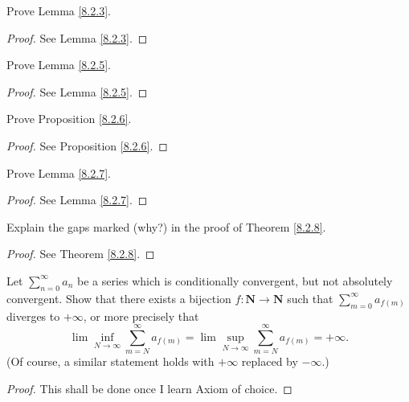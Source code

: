 \exercisesection

\begin{exercise}\label{ex 8.2.1}
Prove Lemma \ref{8.2.3}.
\end{exercise}

\begin{proof}
See Lemma \ref{8.2.3}.
\end{proof}

\begin{exercise}\label{ex 8.2.2}
Prove Lemma \ref{8.2.5}.
\end{exercise}

\begin{proof}
See Lemma \ref{8.2.5}.
\end{proof}

\begin{exercise}\label{ex 8.2.3}
Prove Proposition \ref{8.2.6}.
\end{exercise}

\begin{proof}
See Proposition \ref{8.2.6}.
\end{proof}

\begin{exercise}\label{ex 8.2.4}
Prove Lemma \ref{8.2.7}.
\end{exercise}

\begin{proof}
See Lemma \ref{8.2.7}.
\end{proof}

\begin{exercise}\label{ex 8.2.5}
Explain the gaps marked (why?) in the proof of Theorem \ref{8.2.8}.
\end{exercise}

\begin{proof}
See Theorem \ref{8.2.8}.
\end{proof}

\begin{exercise}\label{ex 8.2.6}
Let \(\sum_{n = 0}^\infty a_n\) be a series which is conditionally convergent, but not absolutely convergent.
Show that there exists a bijection \(f : \mathbf{N} \to \mathbf{N}\) such that \(\sum_{m = 0}^\infty a_{f(m)}\) diverges to \(+\infty\), or more precisely that
\[
    \lim\inf_{N \to \infty} \sum_{m = N}^\infty a_{f(m)} = \lim\sup_{N \to \infty} \sum_{m = N}^\infty a_{f(m)} = +\infty.
\]
(Of course, a similar statement holds with \(+\infty\) replaced by \(-\infty\).)
\end{exercise}

\begin{proof}
This shall be done once I learn Axiom of choice.
\end{proof}